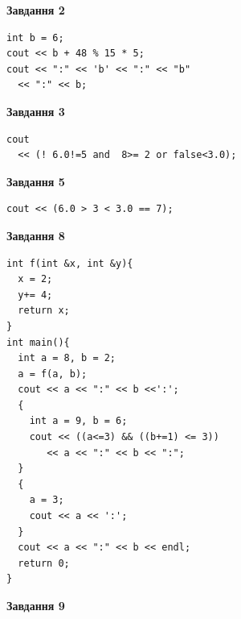 \documentclass[12pt, ukrainian]{article}
\begin{document}
{\begin {large}
\begin{minipage}[t]{7.0cm}
\end{minipage}
\vline \hspace{1mm}
\begin{minipage}[t]{11.0cm}

\begin{center}
\textbf{Завдання 2}
\end{center}
\vspace{-8mm}

\begin{verbatim}
int b = 6;
cout << b + 48 % 15 * 5;
cout << ":" << 'b' << ":" << "b" 
  << ":" << b;
\end{verbatim}



\begin{center}
\textbf{Завдання 3}
\end{center}
\vspace{-8mm}

\begin{verbatim}
cout 
  << (! 6.0!=5 and  8>= 2 or false<3.0);
\end{verbatim}



\begin{center}
\textbf{Завдання 5}
\end{center}
\vspace{-8mm}

\begin{verbatim}
cout << (6.0 > 3 < 3.0 == 7);
\end{verbatim}



\begin{center}
\textbf{Завдання 8}
\end{center}
\vspace{-8mm}

\begin{verbatim}
int f(int &x, int &y){
  x = 2;
  y+= 4;
  return x;
}
int main(){
  int a = 8, b = 2;
  a = f(a, b);
  cout << a << ":" << b <<':';
  {
    int a = 9, b = 6;
    cout << ((a<=3) && ((b+=1) <= 3))
       << a << ":" << b << ":";
  }
  {
    a = 3;
    cout << a << ':';
  }
  cout << a << ":" << b << endl;
  return 0;
}
\end{verbatim}

\end{minipage}


\begin{minipage}[t]{7.0cm}

\begin{center}
\textbf{Завдання 9}
\end{center}
\vspace{-8mm}


\end{minipage}
\end{large}}
\end{document}
